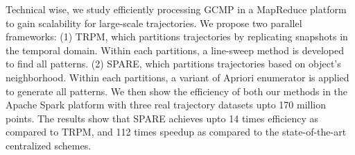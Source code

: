 Technical wise, we study efficiently processing GCMP in a MapReduce platform to gain scalability for large-scale trajectories. We propose two parallel frameworks: (1) TRPM, which partitions trajectories by replicating snapshots in the temporal domain. Within each partitions, a line-sweep method is developed to find all patterns. (2) SPARE, which partitions trajectories based on object's neighborhood. Within each partitions, a variant of Apriori enumerator is applied to generate all patterns. We then show the efficiency of both our methods in the Apache Spark platform with three real trajectory datasets upto 170 million points. The results show that SPARE achieves upto 14 times efficiency as compared to TRPM, and 112 times speedup as compared to the state-of-the-art centralized schemes.